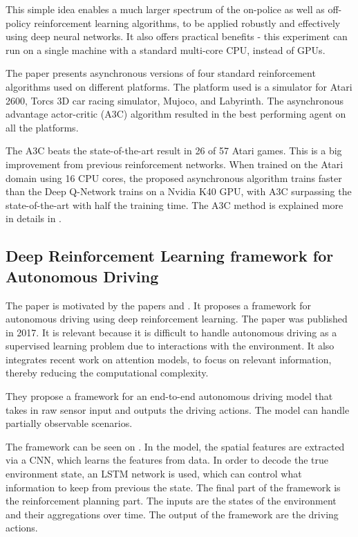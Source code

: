This simple idea enables a much larger spectrum of the on-police as well as off-policy reinforcement learning algorithms, to be applied robustly and effectively using deep neural networks. It also offers practical benefits - this experiment can run on a single machine with a standard multi-core CPU, instead of GPUs.

The paper presents asynchronous versions of four standard reinforcement algorithms used on different platforms. The platform used is a simulator for Atari 2600, Torcs 3D car racing simulator, Mujoco, and Labyrinth. The asynchronous advantage actor-critic (A3C) algorithm resulted in the best performing agent on all the platforms.

The A3C beats the state-of-the-art result in 26 of 57 Atari games. This is a big improvement from previous reinforcement networks. When trained on the Atari domain using 16 CPU cores, the proposed asynchronous algorithm trains faster than the Deep Q-Network trains on a Nvidia K40 GPU, with A3C surpassing the state-of-the-art with half the training time. The A3C method is explained more in details in .
   
\subsection{Deep Reinforcement Learning framework for Autonomous Driving} 
The paper \cite{Sallab:2017:2470-1173:70} is motivated by the papers \cite{DBLP:journals/corr/MnihKSGAWR13} and \cite{Silver_2016}. It proposes a framework for autonomous driving using deep reinforcement learning. The paper was published in 2017. It is relevant because it is difficult to handle autonomous driving as a supervised learning problem due to interactions with the environment. It also integrates recent work on attention models, to focus on relevant information, thereby reducing the computational complexity.

They propose a framework for an end-to-end autonomous driving model that takes in raw sensor input and outputs the driving actions. The model can handle partially observable scenarios.  

The framework can be seen on . In the model, the spatial features are extracted via a CNN, which learns the features from data. In order to decode the true environment state, an LSTM network is used, which can control what information to keep from previous the state. The final part of the framework is the reinforcement planning part. The inputs are the states of the environment and their aggregations over time. The output of the framework are the driving actions.  

